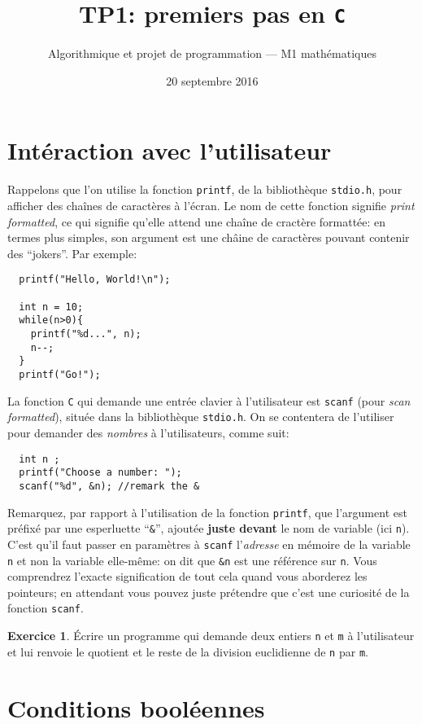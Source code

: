 \documentclass[french,a4paper]{article}
\title{\sffamily TP1: premiers pas en {\tt C}}
\date{20 septembre 2016}
\author{Algorithmique et projet de programmation --- M1 mathématiques}
\theoremstyle{definition}
\newtheorem{exercise}{Exercice}
\theoremstyle{remark}
\newcommand{\inlinec}[1]{\lstinline[style=C]°#1°}
\begin{document}
\maketitle

\section{Intéraction avec l'utilisateur}
\label{sec:user-io}

Rappelons que l'on utilise la fonction \inlinec{printf}, de la
bibliothèque \inlinec{stdio.h}, pour afficher des chaînes de caractères
à l'écran. Le nom de cette fonction signifie {\em print formatted}, ce
qui signifie qu'elle attend une chaîne de cractère formattée: en
termes plus simples, son argument est une châine de caractères pouvant
contenir des ``jokers''. Par exemple:
\begin{lstlisting}
  printf("Hello, World!\n");

  int n = 10;
  while(n>0){
    printf("%d...", n);
    n--;
  }
  printf("Go!");
\end{lstlisting}

La fonction {\tt C} qui demande une entrée clavier à l'utilisateur est
\inlinec{scanf} (pour {\em scan formatted}), située dans la bibliothèque \inlinec{stdio.h}. On se
contentera de l'utiliser pour demander des {\em nombres} à
l'utilisateurs, comme suit:
\begin{lstlisting}
  int n ;
  printf("Choose a number: ");
  scanf("%d", &n); //remark the &
\end{lstlisting}
Remarquez, par rapport à l'utilisation de la fonction
\inlinec{printf}, que l'argument est préfixé par une esperluette
``\inlinec{&}'', ajoutée {\bf juste devant} le nom de variable (ici
\inlinec{n}). C'est qu'il faut passer en paramètres à \inlinec{scanf}
l'{\em adresse} en mémoire de la variable \inlinec n et non la
variable elle-même: on dit que \inlinec{&n} est une référence sur
\inlinec n. Vous comprendrez l'exacte signification de tout cela quand
vous aborderez les pointeurs; en attendant vous pouvez juste prétendre
que c'est une curiosité de la fonction \inlinec{scanf}.

\begin{exercise}
  \'Ecrire un programme qui demande deux entiers \inlinec{n} et
  \inlinec{m} à l'utilisateur et lui renvoie le quotient et le reste
  de la division euclidienne de \inlinec{n} par \inlinec{m}.
\end{exercise}

\section{Conditions booléennes}
\label{sec:bool}
\end{document}
